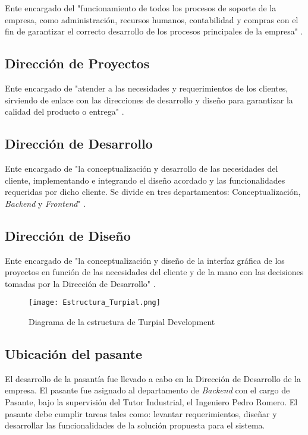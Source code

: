 Ente encargado del "funcionamiento de todos los procesos de soporte de la empresa, como administración, recursos humanos, contabilidad y compras con el fin de garantizar el correcto desarrollo de los procesos principales de la empresa" \cite{manualTurpial}.

\subsection*{Dirección de Proyectos}

Ente encargado de "atender a las necesidades y requerimientos de los clientes, sirviendo de enlace con las direcciones de desarrollo y diseño para garantizar la calidad del producto o entrega" \cite{manualTurpial}.

\subsection*{Dirección de Desarrollo}

Ente encargado de "la conceptualización y desarrollo de las necesidades del cliente, implementando e integrando el diseño acordado y las funcionalidades requeridas por dicho cliente. Se divide en tres departamentos: Conceptualización, \textit{Backend} y \textit{Frontend}" \cite{manualTurpial}.

\subsection*{Dirección de Diseño}

Ente encargado de "la conceptualización y diseño de la interfaz gráfica de los proyectos en función de las necesidades del cliente y de la mano con las decisiones tomadas por la Dirección de Desarrollo" \cite{manualTurpial}.

\begin{figure}[h]
\centering
\texttt{[image: Estructura\_Turpial.png]}
\caption{Diagrama de la estructura de Turpial Development}
\label{fig:figura1.1}
\end{figure}

\subsection*{Ubicación del pasante}

El desarrollo de la pasantía fue llevado a cabo en la Dirección de Desarrollo de la empresa. El pasante fue asignado al departamento de \textit{Backend} con el cargo de Pasante, bajo la supervisión del Tutor Industrial, el Ingeniero Pedro Romero. El pasante debe cumplir tareas tales como: levantar requerimientos, diseñar y desarrollar las funcionalidades de la solución propuesta para el sistema.
